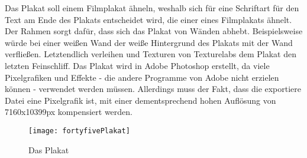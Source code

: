 Das
Plakat soll einem Filmplakat ähneln, weshalb sich für eine Schriftart für den Text am Ende des Plakats entscheidet wird, die einer eines Filmplakats ähnelt. Der Rahmen sorgt dafür, dass sich das Plakat von Wänden abhebt. Beispielsweise würde bei einer weißen Wand der weiße Hintergrund des Plakats mit der Wand verfließen. Letztendlich verleihen
 und  Texturen von Texturelabs dem Plakat den letzten Feinschliff. Das Plakat wird in Adobe Photoshop erstellt, da viele Pixelgrafiken und Effekte - die andere Programme von Adobe nicht erzielen können - verwendet werden müssen. Allerdings muss der Fakt, dass die exportiere Datei eine Pixelgrafik ist, mit einer dementsprechend hohen Auflösung von 7160x10399px kompensiert werden.

\begin{figure}[H]
    \centering
    \texttt{[image: fortyfivePlakat]}
    \caption{Das \FF Plakat}
\end{figure}

\renewcommand{\kapitelautor}{}